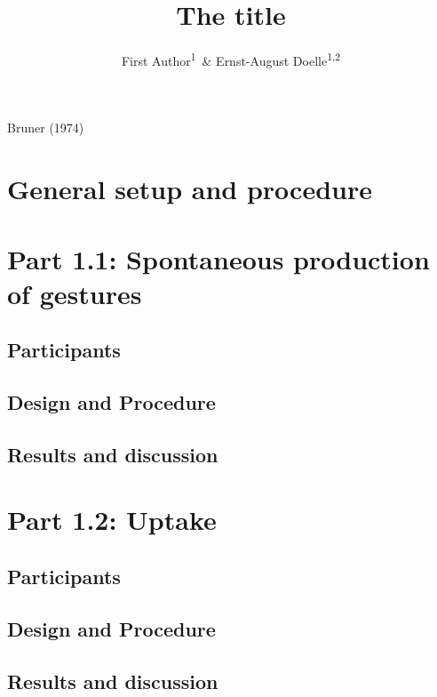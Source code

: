 \documentclass[man]{apa6}
\title{The title}
\author{First Author\textsuperscript{1}~\& Ernst-August Doelle\textsuperscript{1,2}}
\affiliation{
    \vspace{0.5cm}
          \textsuperscript{1} Wilhelm-Wundt-University\\
          \textsuperscript{2} Konstanz Business School  }
\theoremstyle{definition}
\theoremstyle{definition}
\theoremstyle{definition}
\theoremstyle{remark}
\begin{document}
\maketitle

\setcounter{secnumdepth}{0}



Bruner (1974)

\section{General setup and procedure}\label{general-setup-and-procedure}

\section{Part 1.1: Spontaneous production of
gestures}\label{part-1.1-spontaneous-production-of-gestures}

\subsection{Participants}\label{participants}

\subsection{Design and Procedure}\label{design-and-procedure}

\subsection{Results and discussion}\label{results-and-discussion}

\section{Part 1.2: Uptake}\label{part-1.2-uptake}

\subsection{Participants}\label{participants-1}

\subsection{Design and Procedure}\label{design-and-procedure-1}

\subsection{Results and discussion}\label{results-and-discussion-1}
\end{document}
